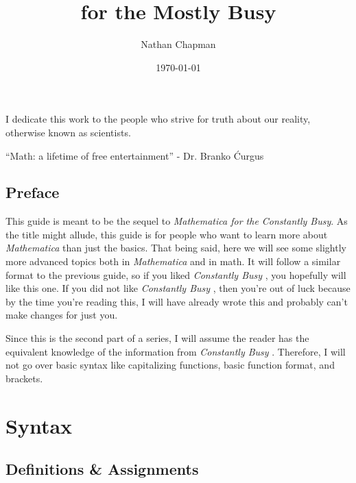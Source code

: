 \documentclass[11pt,letterpaper,twoside,titlepage]{book}
\author{Nathan Chapman}
\title{\Mathematica for the Mostly Busy}
\date{\today}
\newenvironment{dedication}
  {%
   \thispagestyle{empty}%
   \vspace*{\stretch{1}}%
   \itshape             %
   \raggedleft          %
  }
  {\par %
   \vspace{\stretch{3}} %
   \clearpage           %
  }
\newcommand{\Mathematica}{\textit{Mathematica} }
\newcommand{\CB}{\emph{Constantly Busy} }
\begin{document}
	\maketitle
	
	\begin{dedication}
	
		I dedicate this work to the people who strive for truth about our reality, otherwise known as scientists.
		
		``Math: a lifetime of free entertainment''
		- Dr. Branko \'{C}urgus
	
	\end{dedication}
	
	\chapter*{Preface}
	
		This guide is meant to be the sequel to \emph{\Mathematica for the Constantly Busy}.  As the title might allude, this guide is for people who want to learn more about \Mathematica than just the basics.  That being said, here we will see some slightly more advanced topics both in \Mathematica and in math.  It will follow a similar format to the previous guide, so if you liked \CB, you hopefully will like this one.  If you did not like \CB, then you're out of luck because by the time you're reading this, I will have already wrote this and probably can't make changes for just you.
		
		Since this is the second part of a series, I will assume the reader has the equivalent knowledge of the information from \CB.  Therefore, I will not go over basic syntax like capitalizing functions, basic function format, and brackets.
		
\newpage
	
	\tableofcontents
		
	\part{Syntax}
	
		
		\chapter{Definitions \& Assignments}
		
\end{document}
